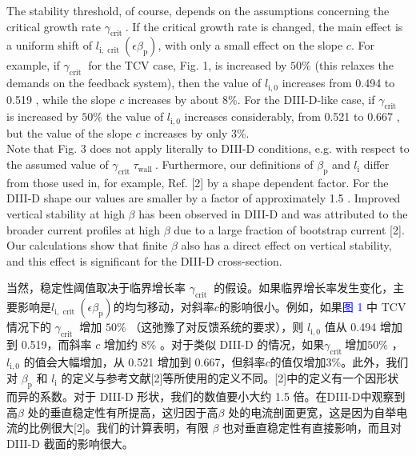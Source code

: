 \documentclass[utf8]{ctexart}
\newcommand\enzhbox[2]{
  	\quad\par \begin{paracol}{2} \colseprulecolor{black} 
  		\begin{spacing}{1.0}
  			\footnotesize  #1
  		\end{spacing}
  		\switchcolumn[1] 
  		#2
  	\end{paracol} \quad\par
  }
\begin{document}
\begin{sloppypar}
 
\enzhbox{  The stability threshold, of course, depends on the assumptions concerning the critical growth rate $\gamma_{\text {crit }}$. If the critical growth rate is changed, the main effect is a uniform shift of $l_{\mathrm{i}, \text { crit }}\left(\epsilon \beta_{\mathrm{p}}\right)$, with only a small effect on the slope $c$. For example, if $\gamma_{\text {crit }}$ for the TCV case, Fig. 1, is increased by $50 \%$ (this relaxes the demands on the feedback system), then the value of $l_{\mathrm{i}, 0}$ increases from 0.494 to 0.519 , while the slope $c$ increases by about $8 \%$. For the DIII-D-like case, if $\gamma_{\text {crit }}$ is increased by $50 \%$ the value of $l_{\mathrm{i}, 0}$ increases considerably, from 0.521 to 0.667 , but the value of the slope $c$ increases by only $3 \%$.\\ Note that Fig. 3 does not apply literally to DIII-D conditions, e.g. with respect to the assumed value of $\gamma_{\text {crit }} \tau_{\text {wall }}$. Furthermore, our definitions of $\beta_{\mathrm{p}}$ and $l_{\mathrm{i}}$ differ from those used in, for example, Ref. \textcolor{green!50!black}{[2]} by a shape dependent factor. For the DIII-D shape our values are smaller by a factor of approximately 1.5 . Improved vertical stability at high $\beta$ has been observed in DIII-D and was attributed to the broader current profiles at high $\beta$ due to a large fraction of bootstrap current \textcolor{green!50!black}{[2]}. Our calculations show that finite $\beta$ also has a direct effect on vertical stability, and this effect is significant for the DIII-D cross-section.}{
当然，稳定性阈值取决于临界增长率 $\gamma_{\text {crit }}$ 的假设。如果临界增长率发生变化，主要影响是$l_{\mathrm{i}, \text { crit }}\left(\epsilon \beta_{\mathrm{p}}\right)$的均匀移动，对斜率$c$的影响很小。例如，如果\textcolor{blue}{图 1} 中 TCV 情况下的 $\gamma_{\text {crit }}$ 增加 $50 \%$ （这弛豫了对反馈系统的要求），则 $l_{\mathrm{i}, 0}$  值从 0.494 增加到 0.519，而斜率 $c$ 增加约 $8 \%$ 。对于类似 DIII-D 的情况，如果$\gamma_{\text {crit }}$增加$50 \%$ ，$l_{\mathrm{i}, 0}$ 的值会大幅增加，从 0.521 增加到 0.667，但斜率$c$的值仅增加$3 \%$。此外，我们对 $\beta_{\mathrm{p}}$  和 $l_{\mathrm{i}}$  的定义与参考文献\textcolor{green!50!black}{[2]}等所使用的定义不同。\textcolor{green!50!black}{[2]}中的定义有一个因形状而异的系数。对于 DIII-D 形状，我们的数值要小大约 1.5 倍。在DIII-D中观察到高$\beta$ 处的垂直稳定性有所提高，这归因于高$\beta$ 处的电流剖面更宽，这是因为自举电流的比例很大\textcolor{green!50!black}{[2]}。我们的计算表明，有限 $\beta$  也对垂直稳定性有直接影响，而且对 DIII-D 截面的影响很大。}

\end{sloppypar}
\end{document}
